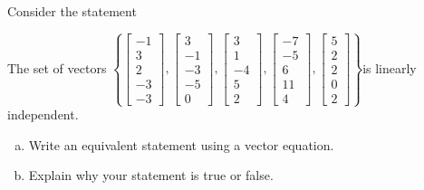
\begin{exerciseStatement}


Consider the statement 
\begin{center}\begin{minipage}{0.8\textwidth}
 The set of vectors \( \left\{ \left[\begin{array}{c}
-1 \\
3 \\
2 \\
-3 \\
-3
\end{array}\right] , \left[\begin{array}{c}
3 \\
-1 \\
-3 \\
-5 \\
0
\end{array}\right] , \left[\begin{array}{c}
3 \\
1 \\
-4 \\
5 \\
2
\end{array}\right] , \left[\begin{array}{c}
-7 \\
-5 \\
6 \\
11 \\
4
\end{array}\right] , \left[\begin{array}{c}
5 \\
2 \\
2 \\
0 \\
2
\end{array}\right] \right\} \)is linearly independent.
\end{minipage}\end{center}
    


\begin{enumerate}[(a)]
\item  Write an equivalent statement using a vector equation.
\item  Explain why your statement is true or false.
\end{enumerate}
    
\end{exerciseStatement}
    
